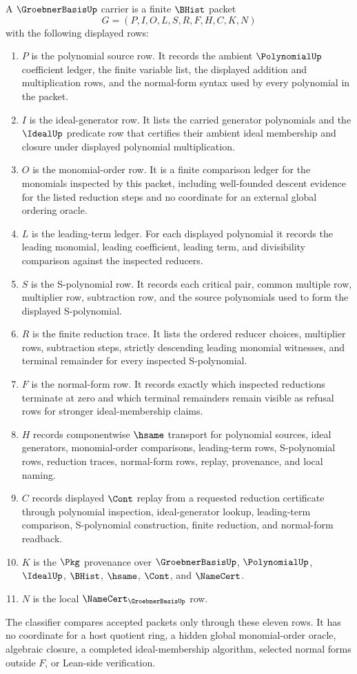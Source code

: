 \begin{definition}
\label{def:groebner-basis-carrier}
A $\GroebnerBasisUp$ carrier is a finite $\BHist$ packet
$$
G=(P,I,O,L,S,R,F,H,C,K,N)
$$
with the following displayed rows:
\begin{enumerate}
\item $P$ is the polynomial source row. It records the ambient $\PolynomialUp$ coefficient ledger, the finite variable list, the displayed addition and multiplication rows, and the normal-form syntax used by every polynomial in the packet.
\item $I$ is the ideal-generator row. It lists the carried generator polynomials and the $\IdealUp$ predicate row that certifies their ambient ideal membership and closure under displayed polynomial multiplication.
\item $O$ is the monomial-order row. It is a finite comparison ledger for the monomials inspected by this packet, including well-founded descent evidence for the listed reduction steps and no coordinate for an external global ordering oracle.
\item $L$ is the leading-term ledger. For each displayed polynomial it records the leading monomial, leading coefficient, leading term, and divisibility comparison against the inspected reducers.
\item $S$ is the S-polynomial row. It records each critical pair, common multiple row, multiplier row, subtraction row, and the source polynomials used to form the displayed S-polynomial.
\item $R$ is the finite reduction trace. It lists the ordered reducer choices, multiplier rows, subtraction steps, strictly descending leading monomial witnesses, and terminal remainder for every inspected S-polynomial.
\item $F$ is the normal-form row. It records exactly which inspected reductions terminate at zero and which terminal remainders remain visible as refusal rows for stronger ideal-membership claims.
\item $H$ records componentwise $\hsame$ transport for polynomial sources, ideal generators, monomial-order comparisons, leading-term rows, S-polynomial rows, reduction traces, normal-form rows, replay, provenance, and local naming.
\item $C$ records displayed $\Cont$ replay from a requested reduction certificate through polynomial inspection, ideal-generator lookup, leading-term comparison, S-polynomial construction, finite reduction, and normal-form readback.
\item $K$ is the $\Pkg$ provenance over $\GroebnerBasisUp$, $\PolynomialUp$, $\IdealUp$, $\BHist$, $\hsame$, $\Cont$, and $\NameCert$.
\item $N$ is the local $\NameCert_{\GroebnerBasisUp}$ row.
\end{enumerate}
The classifier compares accepted packets only through these eleven rows. It has no coordinate for a host quotient ring, a hidden global monomial-order oracle, algebraic closure, a completed ideal-membership algorithm, selected normal forms outside $F$, or Lean-side verification.
\end{definition}
